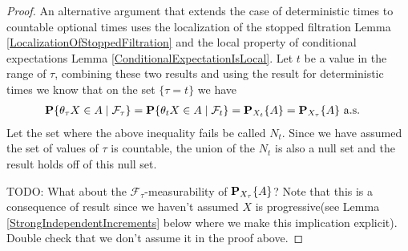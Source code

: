 \begin{proof}
An alternative argument that extends the case of deterministic times
to countable optional times uses the localization of the stopped
filtration Lemma \ref{LocalizationOfStoppedFiltration} and the local
property of conditional expectations Lemma
\ref{ConditionalExpectationIsLocal}.  Let $t$ be a value in the range
of $\tau$, combining these two results and
using the result for deterministic times we
know that on the set $\lbrace \tau = t \rbrace$ we have
\begin{align*}
\cprobability{\mathcal{F}_{\tau}}{\theta_\tau X \in A} &=
\cprobability{\mathcal{F}_t}{\theta_t X \in A} = \sprobability{A}{X_t}
 = \sprobability{A}{X_\tau} \text{ a.s.}
\end{align*}
Let the set where the above inequality fails be called $N_t$.  Since
we have assumed the set of values of $\tau$ is countable, the union of
the $N_t$ is also a null set and the result holds off of this null
set.

TODO: What about the $\mathcal{F}_\tau$-measurability of
$\sprobability{A}{X_\tau}$?  Note that this is a consequence of result
since we haven't assumed $X$ is progressive(see Lemma
\ref{StrongIndependentIncrements} below where we make this implication explicit).  Double check that we
don't assume it in the proof above.
\end{proof}

